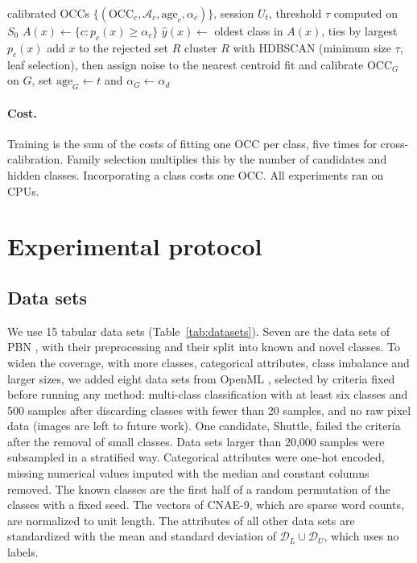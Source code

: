 \documentclass[pdflatex,sn-basic]{sn-jnl}
\newcommand{\DL}{\mathcal{D}_L}
\newcommand{\DU}{\mathcal{D}_U}
\begin{document}
\begin{algorithm}[t]
\caption{One session of incremental discovery}\label{alg:c4}
\begin{algorithmic}[1]
\Require calibrated OCCs $\{(\mathrm{OCC}_c, \mathcal{A}_c, \mathrm{age}_c, \alpha_c)\}$, session $U_t$, threshold $\tau$ computed on $S_0$
  \State $A(x) \gets \{c : p_c(x) \ge \alpha_c\}$ 
   \State $\hat{y}(x) \gets$ oldest class in $A(x)$, ties by largest $p_c(x)$
  \Else \State add $x$ to the rejected set $R$ \EndIf
\EndFor
\State cluster $R$ with HDBSCAN (minimum size $\tau$, leaf selection), then assign noise to the nearest centroid
  \State fit and calibrate $\mathrm{OCC}_G$ on $G$, set $\mathrm{age}_G \gets t$ and $\alpha_G \gets \alpha_d$ 
\EndFor
\end{algorithmic}
\end{algorithm}

\paragraph{Cost.} Training is the sum of the costs of fitting one OCC per class, five times for cross-calibration. Family selection multiplies this by the number of candidates and hidden classes. Incorporating a class costs one OCC. All experiments ran on CPUs.

\section{Experimental protocol}\label{sec:protocol}

\subsection{Data sets}\label{sec:datasets}

We use 15 tabular data sets (Table~\ref{tab:datasets}). Seven are the data sets of PBN \citep{troisemaine2024pbn}, with their preprocessing and their split into known and novel classes. To widen the coverage, with more classes, categorical attributes, class imbalance and larger sizes, we added eight data sets from OpenML \citep{vanschoren2013openml}, selected by criteria fixed before running any method: multi-class classification with at least six classes and 500 samples after discarding classes with fewer than 20 samples, and no raw pixel data (images are left to future work). One candidate, Shuttle, failed the criteria after the removal of small classes. Data sets larger than 20,000 samples were subsampled in a stratified way. Categorical attributes were one-hot encoded, missing numerical values imputed with the median and constant columns removed. The known classes are the first half of a random permutation of the classes with a fixed seed. The vectors of CNAE-9, which are sparse word counts, are normalized to unit length. The attributes of all other data sets are standardized with the mean and standard deviation of $\DL \cup \DU$, which uses no labels.
\end{document}
